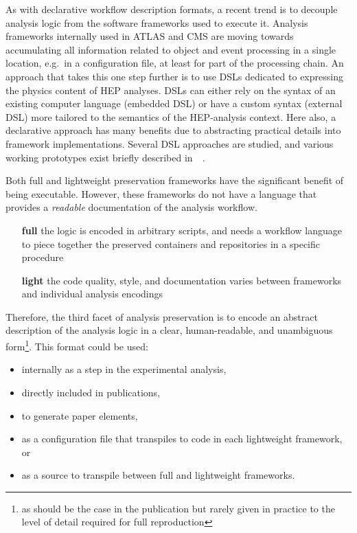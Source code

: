 \documentclass[11pt]{article}
\begin{document}
As with declarative workflow description formats, a recent trend is to decouple analysis logic from the software frameworks used to execute it. Analysis frameworks internally used in \gls{ATLAS} and \gls{CMS}
are moving towards accumulating all information related to object and event processing in a single location, e.g.~in a configuration file, at least for part of the processing chain. An approach that takes this one step further is to use \glspl{DSL} dedicated to expressing the physics content of \gls{HEP} analyses. \glspl{DSL} can either rely on the syntax of an existing computer language (embedded \gls{DSL}) or have a custom syntax (external \gls{DSL}) more tailored to the semantics of the \gls{HEP}-analysis context. Here also, a declarative approach has many benefits due to abstracting practical details into framework implementations. Several \gls{DSL} approaches are studied, and various working prototypes exist briefly described in~~\cite{Sekmen:2020vph}. 

Both full and lightweight preservation frameworks have the significant benefit of being executable. %
However, these frameworks do not have a language that provides a \emph{readable} documentation of the analysis workflow.
\begin{itemize}
    \item[\textbf{full}] the logic is encoded in arbitrary scripts, and needs a workflow language to piece together the preserved containers and repositories in a specific procedure
    \item[\textbf{light}] the code quality, style, and documentation varies between frameworks and individual analysis encodings
\end{itemize}

Therefore, the third facet of \gls{analysis preservation} is to encode an abstract description of the analysis logic in a clear, human-readable, and unambiguous form\footnote{as should be the case in the publication but rarely given in practice to the level of detail required for full reproduction}. This format could be used:
\begin{itemize}
    \item internally as a step in the experimental analysis, 
    \item directly included in publications,
    \item to generate paper elements,
    \item as a configuration file that transpiles to code in each lightweight framework, or
    \item as a source to transpile between full and lightweight frameworks.
\end{itemize}
\end{document}
